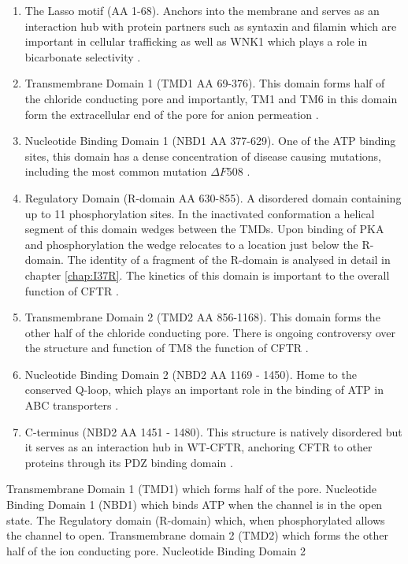 \begin{enumerate}
	\item The Lasso motif (AA 1-68). Anchors into the membrane and serves as an interaction hub with protein partners such as syntaxin and filamin which are important in cellular trafficking \cite{cormet-boyaka2002, naren1998, thelin2007} as well as WNK1 which plays a role in bicarbonate selectivity \cite{kim2019}.
	\item Transmembrane Domain 1 (TMD1 AA 69-376). This domain forms half of the chloride conducting pore and importantly, TM1 and TM6 in this domain form the extracellular end of the pore for anion permeation \cite{linsdell2006, linsdell2022}.
	\item Nucleotide Binding Domain 1 (NBD1 AA 377-629). One of the ATP binding sites, this domain has a dense concentration of disease causing mutations, including the most common mutation $\Delta F508$ \cite{cftr2}.
	\item Regulatory Domain (R-domain AA 630-855). A disordered domain containing up to 11 phosphorylation sites\cite{mihalyi2020}. In the inactivated conformation a helical segment of this domain wedges between the TMDs. Upon binding of PKA and phosphorylation the wedge relocates to a location just below the R-domain. The identity of a fragment of the R-domain is analysed in detail in chapter \ref{chap:I37R}. The kinetics of this domain is important to the overall function of CFTR \cite{ostedgaard2000, mihalyi2020}. 
	\item Transmembrane Domain 2 (TMD2 AA 856-1168). This domain forms the other half of the chloride conducting pore. There is ongoing controversy over the structure and function of TM8 the function of CFTR \cite{hegedus2022, liu2019}.
	\item Nucleotide Binding Domain 2 (NBD2 AA 1169 - 1450). Home to the conserved Q-loop, which plays an important role in the binding of ATP in ABC transporters \cite{ivey2020, zolnerciks2014, dong2015}.
	\item C-terminus (NBD2 AA 1451 - 1480). This structure is natively disordered but it serves as an interaction hub in WT-CFTR, anchoring CFTR to other proteins through its PDZ binding domain \cite{moyer1999, cushing2008}. 
\end{enumerate}
Transmembrane Domain 1 (TMD1) which forms half of the pore. Nucleotide Binding Domain 1 (NBD1) which binds ATP when the channel is in the open state. The Regulatory domain (R-domain) which, when phosphorylated allows the channel to open. Transmembrane domain 2 (TMD2) which forms the other half of the ion conducting pore. Nucleotide Binding Domain 2 

